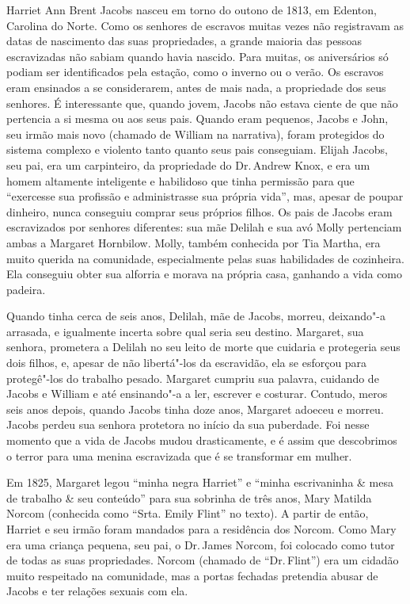 Harriet Ann Brent Jacobs nasceu em torno do outono de 1813, em Edenton,
Carolina do Norte. Como os senhores de escravos muitas vezes não
registravam as datas de nascimento das suas propriedades, a grande
maioria das pessoas escravizadas não sabiam quando havia nascido. Para
muitas, os aniversários só podiam ser identificados pela estação, como o
inverno ou o verão. Os escravos eram ensinados a se considerarem, antes
de mais nada, a propriedade dos seus senhores. É interessante que,
quando jovem, Jacobs não estava ciente de que não pertencia a si mesma
ou aos seus pais. Quando eram pequenos, Jacobs e John, seu irmão mais
novo (chamado de William na narrativa), foram protegidos do sistema
complexo e violento tanto quanto seus pais conseguiam. Elijah Jacobs,
seu pai, era um carpinteiro, da propriedade do Dr.\,Andrew Knox, e
era um homem altamente inteligente e habilidoso que
tinha permissão para que ``exercesse sua profissão e administrasse
sua própria vida'', mas, apesar de poupar dinheiro, nunca conseguiu
comprar seus próprios filhos. Os pais de Jacobs eram escravizados por
senhores diferentes: sua mãe Delilah e sua avó Molly pertenciam ambas a
Margaret Hornbilow. Molly, também conhecida por Tia Martha, era muito
querida na comunidade, especialmente pelas suas habilidades de
cozinheira. Ela conseguiu obter sua alforria e morava na própria casa,
ganhando a vida como padeira.

Quando tinha cerca de seis anos, Delilah, mãe de Jacobs, morreu, deixando"-a
arrasada, e igualmente incerta sobre qual seria seu destino.
Margaret, sua senhora, prometera a Delilah no seu leito de morte que
cuidaria e protegeria seus dois filhos, e, apesar de não libertá"-los
da escravidão, ela se esforçou para protegê"-los do trabalho
pesado. Margaret cumpriu sua palavra, cuidando de Jacobs e William e até
ensinando"-a a ler, escrever e costurar. Contudo, meros seis anos depois,
quando Jacobs tinha doze anos, Margaret adoeceu e morreu. Jacobs perdeu
sua senhora protetora no início da sua puberdade. Foi nesse momento que
a vida de Jacobs mudou drasticamente, e é assim que descobrimos o terror
para uma menina escravizada que é se transformar em mulher.

Em 1825, Margaret legou ``minha negra Harriet'' e ``minha escrivaninha
\& mesa de trabalho \& seu conteúdo'' para sua sobrinha de três anos,
Mary Matilda Norcom (conhecida como ``Srta. Emily Flint'' no texto). A
partir de então, Harriet e seu irmão foram mandados para a residência
dos Norcom. Como Mary era uma criança pequena, seu pai, o Dr.\,James
Norcom, foi colocado como tutor de todas
as suas propriedades. Norcom (chamado de ``Dr.\,Flint'') era um cidadão
muito respeitado na comunidade, mas a portas fechadas pretendia abusar
de Jacobs e ter relações sexuais com ela.

